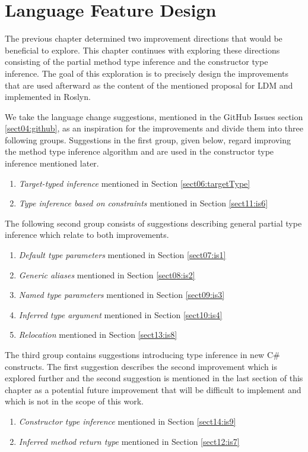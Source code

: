 \chapter{Language Feature Design} \label{sect09:lang}

The previous chapter determined two improvement directions that would be beneficial to explore. 
This chapter continues with exploring these directions consisting of the partial method type inference and the constructor type inference. 
The goal of this exploration is to precisely design the improvements that are used afterward as the content of the mentioned proposal for \ac{LDM} and implemented in Roslyn.
\par
We take the language change suggestions, mentioned in the GitHub Issues section \ref{sect04:github}, as an inspiration for the improvements and divide them into three following groups.
Suggestions in the first group, given below, regard improving the method type inference algorithm and are used in the constructor type inference mentioned later.
\begin{enumerate}
  \item \textit{Target-typed inference} mentioned in Section \ref{sect06:targetType}
  \item \textit{Type inference based on constraints} mentioned in Section \ref{sect11:is6}
\end{enumerate}
The following second group consists of suggestions describing general partial type inference which relate to both improvements.
\begin{enumerate}
  \item \textit{Default type parameters} mentioned in Section \ref{sect07:is1}
  \item \textit{Generic aliases} mentioned in Section \ref{sect08:is2}
  \item \textit{Named type parameters} mentioned in Section \ref{sect09:is3}
  \item \textit{Inferred type argument} mentioned in Section \ref{sect10:is4}
  \item \textit{Relocation} mentioned in Section \ref{sect13:is8}
\end{enumerate}
The third group contains suggestions introducing type inference in new C\# constructs. 
The first suggestion describes the second improvement which is explored further and the second suggestion is mentioned in the last section of this chapter as a potential future improvement that will be difficult to implement and which is not in the scope of this work.
\begin{enumerate}
  \item \textit{Constructor type inference} mentioned in Section \ref{sect14:is9}
  \item \textit{Inferred method return type} mentioned in Section \ref{sect12:is7}
\end{enumerate}

